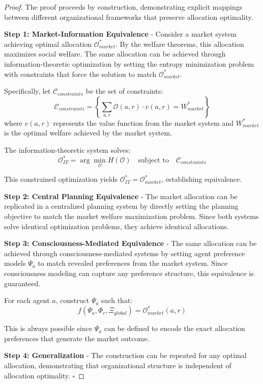 \documentclass[12pt,a4paper]{article}
\begin{document}
\begin{proof}
The proof proceeds by construction, demonstrating explicit mappings between different organizational frameworks that preserve allocation optimality.

\textbf{Step 1: Market-Information Equivalence} - Consider a market system achieving optimal allocation $\mathcal{O}^*_{market}$. By the welfare theorems, this allocation maximizes social welfare. The same allocation can be achieved through information-theoretic optimization by setting the entropy minimization problem with constraints that force the solution to match $\mathcal{O}^*_{market}$.

Specifically, let $\mathcal{C}_{constraints}$ be the set of constraints:
\begin{equation}
\mathcal{C}_{constraints} = \left\{\sum_{a,r} \mathcal{O}(a,r) \cdot v(a,r) = W^*_{market}\right\}
\end{equation}
where $v(a,r)$ represents the value function from the market system and $W^*_{market}$ is the optimal welfare achieved by the market system.

The information-theoretic system solves:
\begin{equation}
\mathcal{O}^*_{IT} = \arg\min_{\mathcal{O}} H(\mathcal{O}) \quad \text{subject to} \quad \mathcal{C}_{constraints}
\end{equation}

This constrained optimization yields $\mathcal{O}^*_{IT} = \mathcal{O}^*_{market}$, establishing equivalence.

\textbf{Step 2: Central Planning Equivalence} - The market allocation can be replicated in a centralized planning system by directly setting the planning objective to match the market welfare maximization problem. Since both systems solve identical optimization problems, they achieve identical allocations.

\textbf{Step 3: Consciousness-Mediated Equivalence} - The same allocation can be achieved through consciousness-mediated systems by setting agent preference models $\Psi_a$ to match revealed preferences from the market system. Since consciousness modeling can capture any preference structure, this equivalence is guaranteed.

For each agent $a$, construct $\Psi_a$ such that:
\begin{equation}
f(\Psi_a, \Phi_r, \Xi_{global}) = \mathcal{O}^*_{market}(a,r)
\end{equation}

This is always possible since $\Psi_a$ can be defined to encode the exact allocation preferences that generate the market outcome.

\textbf{Step 4: Generalization} - The construction can be repeated for any optimal allocation, demonstrating that organizational structure is independent of allocation optimality. $\square$
\end{proof}
\end{document}
